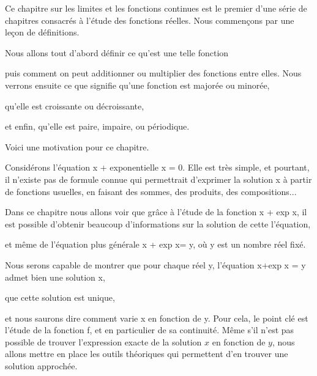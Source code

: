 







\debuttexte


\diapo

\change
Ce chapitre sur les limites et les 
fonctions continues est le premier d'une série de chapitres consacrés à l'étude des 
fonctions réelles. Nous commençons par une leçon de définitions.

\change
Nous allons tout d'abord définir ce qu'est une telle fonction

\change
puis comment on peut additionner ou multiplier des fonctions entre elles. Nous verrons ensuite ce que signifie qu'une fonction est majorée ou minorée,

\change
qu'elle est croissante ou décroissante,

\change
et enfin, qu'elle est paire, impaire, ou périodique.

\diapo

Voici une motivation pour ce chapitre.

Considérons l'équation x + exponentielle x = 0. Elle est très simple, et 
pourtant, il n'existe pas de formule connue qui permettrait d'exprimer 
la solution x à partir de fonctions usuelles, en faisant des sommes, des produits, des compositions...

\change
Dans ce chapitre nous allons voir que grâce à l'étude de la fonction x + exp x,
il est possible d'obtenir beaucoup d'informations sur la solution de cette l'équation,

\change
et même de l'équation plus générale x + exp x= y, où y est un nombre réel fixé.


\change
Nous serons capable de montrer que pour chaque réel y,  l'équation x+exp x = y  admet bien une solution x,

\change
que cette solution est unique,


\change
et nous saurons dire comment varie x en fonction de y. Pour cela, le point clé est l'étude de la fonction f, et en particulier de sa continuité. Même s'il n'est pas possible de trouver l'expression exacte de la solution $x$ en fonction de $y$, nous allons mettre en place les outils théoriques qui permettent d'en trouver une solution approchée.



